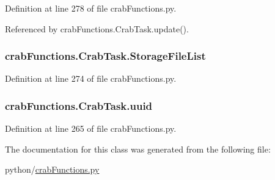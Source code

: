 Definition at line 278 of file crab\-Functions.\-py.



Referenced by crab\-Functions.\-Crab\-Task.\-update().

\subsubsection[{Storage\-File\-List}]{\setlength{\rightskip}{0pt plus 5cm}crab\-Functions.\-Crab\-Task.\-Storage\-File\-List}\label{classcrabFunctions_1_1CrabTask_a015df9b7234b765d870a734689470f4d}


Definition at line 274 of file crab\-Functions.\-py.

\subsubsection[{uuid}]{\setlength{\rightskip}{0pt plus 5cm}crab\-Functions.\-Crab\-Task.\-uuid}\label{classcrabFunctions_1_1CrabTask_affbe775c3b27516558abe99c944a0b99}


Definition at line 265 of file crab\-Functions.\-py.



The documentation for this class was generated from the following file\-:\begin{DoxyCompactItemize}
\item 
python/\hyperlink{crabFunctions_8py}{crab\-Functions.\-py}\end{DoxyCompactItemize}
